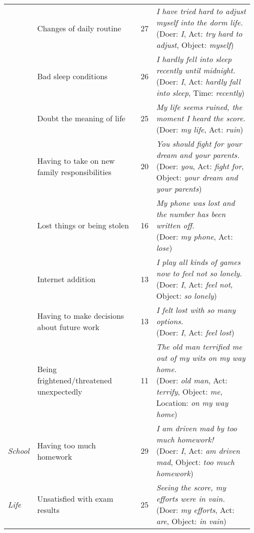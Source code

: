 \begin{table*}
\begin{center}
\begin{footnotesize}
\begin{tabular}{llcl}
&	Changes of daily routine	&	27	&
\tabincell{l}{\emph{I have tried hard to adjust myself into the dorm life.}
\\(Doer: \emph{I}, Act: \emph{try hard to adjust}, Object: \emph{myself})}\\ \cline{2-4}
&	Bad sleep conditions	&	26	&
\tabincell{l}{\emph{I hardly fell into sleep recently until midnight.}
\\(Doer: \emph{I}, Act: \emph{hardly fall into sleep}, Time: \emph{recently})}\\ \cline{2-4}
&	Doubt the meaning of life	&	25	&
\tabincell{l}{\emph{My life seems ruined, the moment I heard the score.}
\\(Doer: \emph{my life}, Act: \emph{ruin})}\\ \cline{2-4}
&	Having to take on new family responsibilities&	20	&
\tabincell{l}{\emph{You should fight for your dream and your parents.}
\\(Doer: \emph{you}, Act: \emph{fight for}, Object: \emph{your dream and your parents})}\\ \cline{2-4}
&	Lost things or being stolen	&	16	&
\tabincell{l}{\emph{My phone was lost and the number has been written off.}
\\(Doer: \emph{my phone}, Act: \emph{lose})}\\ \cline{2-4}
&	Internet addition	&	13	&
\tabincell{l}{\emph{I play all kinds of games now to feel not so lonely.}
\\(Doer: \emph{I}, Act: \emph{feel not}, Object: \emph{so lonely})}\\ \cline{2-4}
&	Having to make decisions about future work&	13	&
\tabincell{l}{\emph{I felt lost with so many options.}
\\(Doer: \emph{I}, Act: \emph{feel lost})}\\ \cline{2-4}
&	Being frightened/threatened unexpectedly	&	11	&
\tabincell{l}{\emph{The old man terrified me out of my wits on my way home.}
\\(Doer: \emph{old man}, Act: \emph{terrify}, Object: \emph{me}, Location: \emph{on my way home})}\\ \hline
\emph{School}&	Having too much homework	&	29	&
\tabincell{l}{\emph{I am driven mad by too much homework!}
\\(Doer: \emph{I}, Act: \emph{am driven mad}, Object: \emph{too much homework})}\\ \cline{2-4}
\emph{Life}&	Unsatisfied with exam results	&	25	&
\tabincell{l}{\emph{Seeing the score, my efforts were in vain.}
\\(Doer: \emph{my efforts}, Act: \emph{are}, Object: \emph{in vain})}\\ \cline{2-4}

\end{tabular}
\end{footnotesize}
\end{center}
\end{table*}

